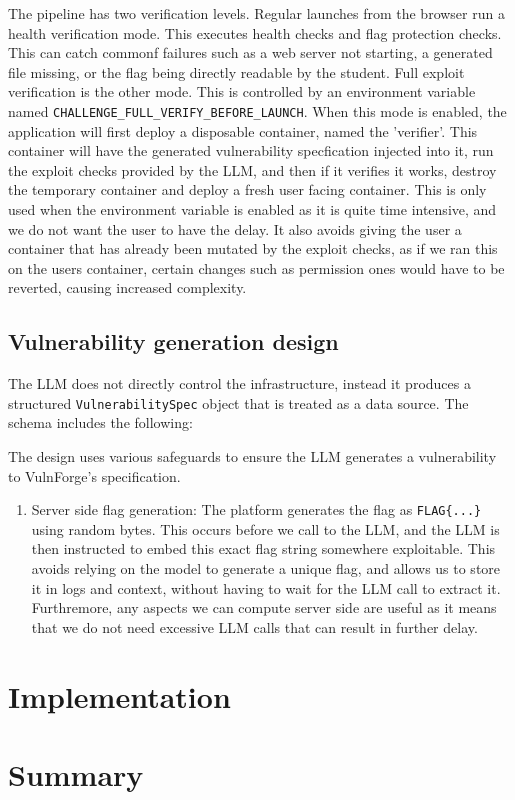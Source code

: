 The pipeline has two verification levels. Regular launches from the browser run a health verification mode. This executes health checks and flag protection checks. This can catch commonf failures such as a web server not starting, a generated file missing, or the flag being directly readable by the student. Full exploit verification is the other mode. This is controlled by an environment variable named \verb|CHALLENGE_FULL_VERIFY_BEFORE_LAUNCH|. When this mode is enabled, the application will first deploy a disposable container, named the 'verifier'. This container will have the generated vulnerability specfication injected into it, run the exploit checks provided by the LLM, and then if it verifies it works, destroy the temporary container and deploy a fresh user facing container. This is only used when the environment variable is enabled as it is quite time intensive, and we do not want the user to have the delay. It also avoids giving the user a container that has already been mutated by the exploit checks, as if we ran this on the users container, certain changes such as permission ones would have to be reverted, causing increased complexity. 


\subsection{Vulnerability generation design}\label{sec:vuln_gen_design}

The LLM does not directly control the infrastructure, instead it produces a structured \verb|VulnerabilitySpec| object that is treated as a data source. The schema includes the following:

The design uses various safeguards to ensure the LLM generates a vulnerability to VulnForge's specification.
\begin{enumerate}
    \item Server side flag generation: The platform generates the flag as \verb|FLAG{...}| using random bytes. This occurs before we call to the LLM, and the LLM is then instructed to embed this exact flag string somewhere exploitable. This avoids relying on the model to generate a unique flag, and allows us to store it in logs and context, without having to wait for the LLM call to extract it. Furthremore, any aspects we can compute server side are useful as it means that we do not need excessive LLM calls that can result in further delay. 
\end{enumerate}

\section{Implementation}\label{sec:impl}


\section{Summary}\label{sec:summary}
